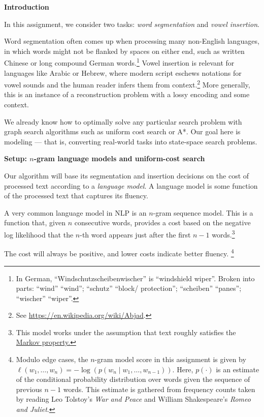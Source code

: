 {\bf Introduction}

In this assignment, we consider two tasks: {\em word segmentation} and {\em vowel
insertion}.

Word segmentation often comes up when processing many non-English languages, in
which words might not be flanked by spaces on either end, such as written
Chinese or long compound German words.\footnote{In German,
``Windschutzscheibenwischer'' is ``windshield wiper''. Broken into parts:
``wind'' \textrightarrow ``wind''; ``schutz'' \textrightarrow ``block/
protection''; ``scheiben'' \textrightarrow ``panes''; ``wischer''
\textrightarrow ``wiper''.} Vowel insertion is relevant for languages like
Arabic or Hebrew, where modern script eschews notations for vowel sounds and the
human reader infers them from context.\footnote{See
\url{https://en.wikipedia.org/wiki/Abjad}.} More generally, this is an instance
of a reconstruction problem with a lossy encoding and some context.

We already know how to optimally solve any particular search problem with graph
search algorithms such as uniform cost search or A*.  Our goal here is modeling
--- that is, converting real-world tasks into state-space search problems.

{\bf Setup: $n$-gram language models and uniform-cost search}

Our algorithm will base its segmentation and insertion decisions on the cost of
processed text according to a {\em language model}. A language model is some
function of the processed text that captures its fluency.

A very common language model in NLP is an $n$-gram sequence model. This is a
function that, given $n$ consecutive words, provides a cost based on the
negative log likelihood that the $n$-th word appears just after the first $n-1$
words.\footnote{This model works under the assumption that text roughly
satisfies the \href{https://en.wikipedia.org/wiki/Markov_property}{Markov
 property.}}

The cost will always be positive, and lower costs indicate better fluency.
\footnote{Modulo edge cases, the $n$-gram model score in this assignment is
given by $\ell(w_1, \ldots, w_n) = -\log(p(w_n \mid w_1, \ldots, w_{n-1}))$.
Here, $p(\cdot)$ is an estimate of the conditional probability distribution over
words given the sequence of previous $n-1$ words.  This estimate is gathered
from frequency counts taken by reading Leo Tolstoy's {\em War and Peace} and
William Shakespeare's {\em Romeo and Juliet}.}

